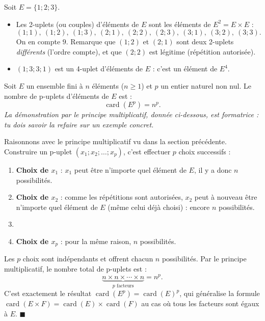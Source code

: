 \documentclass[11pt]{article}
\newcounter{popsec}
\newcounter{popsub}
\newcommand{\courssub}[1]{%
  \stepcounter{popsub}%
  \par\vspace{9pt}\noindent{\popxbold\fontsize{11.5}{13}\selectfont\color{popink}{\color{poporange}\thepopsec.\thepopsub}\hspace{6pt}#1}\par\nopagebreak\vspace{4pt}
}
\def\vdots{\mathord{\vbox{\baselineskip3.2pt\lineskiplimit0pt\kern4pt\hbox{.}\hbox{.}\hbox{.}}}}%
\begin{document}
\begin{exemplebox}
Soit $E = \{1 ; 2 ; 3\}$.
\begin{itemize}
\item Les 2-uplets (ou couples) d'éléments de $E$ sont les éléments de $E^2 = E \times E$ :
\[ (1;1),\ (1;2),\ (1;3),\ (2;1),\ (2;2),\ (2;3),\ (3;1),\ (3;2),\ (3;3). \]
On en compte $9$. Remarque que $(1;2)$ et $(2;1)$ sont deux 2-uplets \emph{différents} (l'ordre compte), et que $(2;2)$ est légitime (répétition autorisée).
\item $(1 ; 3 ; 3 ; 1)$ est un 4-uplet d'éléments de $E$ : c'est un élément de $E^4$.
\end{itemize}
\end{exemplebox}

\courssub{Théorème : nombre de p-uplets}

\begin{propriete}
Soit $E$ un ensemble fini à $n$ éléments ($n \geq 1$) et $p$ un entier naturel non nul. Le nombre de p-uplets d'éléments de $E$ est :
\[ \operatorname{card}(E^p) = n^p. \]
\emph{La démonstration par le principe multiplicatif, donnée ci-dessous, est formatrice : tu dois savoir la refaire sur un exemple concret.}
\end{propriete}

\begin{experience}
Raisonnons avec le principe multiplicatif vu dans la section précédente. Construire un p-uplet $(x_1 ; x_2 ; \ldots ; x_p)$, c'est effectuer $p$ choix successifs :
\begin{enumerate}
\item \textbf{Choix de $x_1$} : $x_1$ peut être n'importe quel élément de $E$, il y a donc $n$ possibilités.
\item \textbf{Choix de $x_2$} : comme les répétitions sont autorisées, $x_2$ peut à nouveau être n'importe quel élément de $E$ (même celui déjà choisi) : encore $n$ possibilités.
\item[$\vdots$]
\item[$p$.] \textbf{Choix de $x_p$} : pour la même raison, $n$ possibilités.
\end{enumerate}
Les $p$ choix sont indépendants et offrent chacun $n$ possibilités. Par le principe multiplicatif, le nombre total de p-uplets est :
\[ \underbrace{n \times n \times \cdots \times n}_{p \text{ facteurs}} = n^p. \]
C'est exactement le résultat $\operatorname{card}(E^p) = \operatorname{card}(E)^p$, qui généralise la formule $\operatorname{card}(E \times F) = \operatorname{card}(E) \times \operatorname{card}(F)$ au cas où tous les facteurs sont égaux à $E$. \hfill $\blacksquare$
\end{experience}
\end{document}
